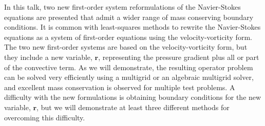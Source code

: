 \documentclass{report}
\begin{document}
In this talk, two new first-order
system reformulations of the Navier-Stokes equations are
presented that admit a wider range of mass conserving
boundary conditions. It is common with least-squares methods
to rewrite the Navier-Stokes equations as a system of
first-order equations using the velocity-vorticity form. The
two new first-order systems are based on the
velocity-vorticity form, but they include a new variable,
$\mathbf{r}$, representing the pressure gradient plus all
or part of the convective term. As we will demonstrate, the
resulting operator problem can be solved very efficiently
using a multigrid or an algebraic multigrid solver, and
excellent mass conservation is observed for multiple test
problems. A difficulty with the new formulations is
obtaining boundary conditions for the new variable,
$\mathbf{r}$, but we will demonstrate at least three
different methods for overcoming this difficulty.



\end{document}
